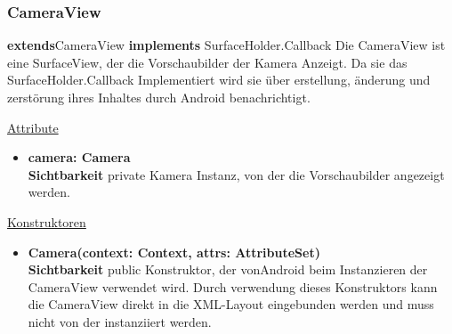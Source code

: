 \subsubsection{CameraView} \label{app:klasse:CameraView}
\textbf{extends}CameraView\newline
\textbf{implements} SurfaceHolder.Callback\newline
Die CameraView ist eine SurfaceView, der die Vorschaubilder der Kamera Anzeigt. Da sie das SurfaceHolder.Callback Implementiert wird sie über erstellung, änderung und zerstörung ihres Inhaltes durch Android benachrichtigt.
\newline

\underline{Attribute}
\begin{itemize}
\itemsep0pt
\item \textbf{camera: Camera} \hfill\\ 
\textbf{Sichtbarkeit} private \newline
Kamera Instanz, von der die Vorschaubilder angezeigt werden.

\end{itemize}

\underline{Konstruktoren}
\begin{itemize}
\itemsep0pt
\item \textbf{Camera(context: Context, attrs: AttributeSet)} \hfill\\
\textbf{Sichtbarkeit} public\newline
Konstruktor, der vonAndroid beim Instanzieren der CameraView verwendet wird. Durch verwendung dieses Konstruktors kann die CameraView direkt in die XML-Layout eingebunden werden und muss nicht von der  instanziiert werden. 
\end{itemize}

